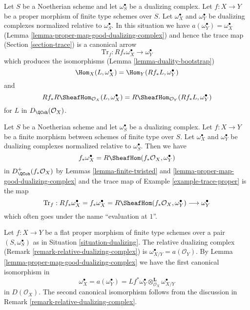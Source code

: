 \begin{example}
\label{example-trace-proper}
Let $S$ be a Noetherian scheme and let $\omega_S^\bullet$ be a
dualizing complex. Let $f : X \to Y$ be a proper morphism of finite
type schemes over $S$. Let $\omega_X^\bullet$ and $\omega_Y^\bullet$
be dualizing complexes normalized relative to $\omega_S^\bullet$.
In this situation we have $a(\omega_Y^\bullet) = \omega_X^\bullet$
(Lemma \ref{lemma-proper-map-good-dualizing-complex})
and hence the trace map (Section \ref{section-trace}) is a canonical arrow
$$
\text{Tr}_f : Rf_*\omega_X^\bullet \longrightarrow \omega_Y^\bullet
$$
which produces the isomorphisms (Lemma \ref{lemma-duality-bootstrap})
$$
\Hom_X(L, \omega_X^\bullet) = \Hom_Y(Rf_*L, \omega_Y^\bullet)
$$
and
$$
Rf_*R\SheafHom_{\mathcal{O}_X}(L, \omega_X^\bullet) =
R\SheafHom_{\mathcal{O}_Y}(Rf_*L, \omega_Y^\bullet)
$$
for $L$ in $D_\QCoh(\mathcal{O}_X)$.
\end{example}

\begin{remark}
\label{remark-dualizing-finite}
Let $S$ be a Noetherian scheme and let $\omega_S^\bullet$ be a dualizing
complex. Let $f : X \to Y$ be a finite morphism between schemes of finite
type over $S$. Let $\omega_X^\bullet$ and $\omega_Y^\bullet$ be
dualizing complexes normalized relative to $\omega_S^\bullet$.
Then we have
$$
f_*\omega_X^\bullet = R\SheafHom(f_*\mathcal{O}_X, \omega_Y^\bullet)
$$
in $D_\QCoh^+(f_*\mathcal{O}_X)$ by Lemmas \ref{lemma-finite-twisted} and
\ref{lemma-proper-map-good-dualizing-complex}
and the trace map of Example \ref{example-trace-proper} is the map
$$
\text{Tr}_f : Rf_*\omega_X^\bullet = f_*\omega_X^\bullet =
R\SheafHom(f_*\mathcal{O}_X, \omega_Y^\bullet) \longrightarrow
\omega_Y^\bullet
$$
which often goes under the name ``evaluation at $1$''.
\end{remark}

\begin{remark}
\label{remark-relative-dualizing-complex-shriek}
Let $f : X \to Y$ be a flat proper morphism of finite type
schemes over a pair $(S, \omega_S^\bullet)$ as in
Situation \ref{situation-dualizing}. The relative dualizing complex
(Remark \ref{remark-relative-dualizing-complex}) is
$\omega_{X/Y}^\bullet = a(\mathcal{O}_Y)$. By
Lemma \ref{lemma-proper-map-good-dualizing-complex}
we have the first canonical isomorphism in
$$
\omega_X^\bullet = a(\omega_Y^\bullet) =
Lf^*\omega_Y^\bullet \otimes_{\mathcal{O}_X}^\mathbf{L} \omega_{X/Y}^\bullet
$$
in $D(\mathcal{O}_X)$. The second canonical isomorphism follows from the
discussion in Remark \ref{remark-relative-dualizing-complex}.
\end{remark}




